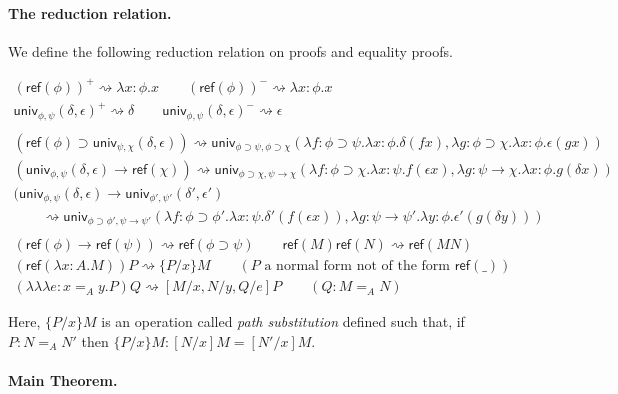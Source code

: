 \documentclass{easychair}
\newcommand{\univ}[4]{\mathsf{univ}_{{#1},{#2}} \left( {#3} , {#4} \right)}
\newcommand{\triplelambda}{\lambda \!\! \lambda \!\! \lambda}
\newcommand{\reff}[1]{\mathsf{ref} \left( {#1} \right)}
\begin{document}
\paragraph{The reduction relation.}

We define the following reduction relation on proofs and equality proofs.

\begin{gather*}
(\reff{\phi})^+ \rightsquigarrow \lambda x : \phi . x
\qquad
(\reff{\phi})^- \rightsquigarrow \lambda x : \phi . x
\\
\univ{\phi}{\psi}{\delta}{\epsilon}^+ \rightsquigarrow \delta
\qquad
\univ{\phi}{\psi}{\delta}{\epsilon}^- \rightsquigarrow \epsilon
\\ \\
(\reff \phi \supset \univ{\psi}{\chi}{\delta}{\epsilon}) \rightsquigarrow \univ{\phi \supset \psi}{\phi \supset \chi}{\lambda f : \phi \supset \psi . \lambda x : \phi . \delta (f x)}{\lambda g : \phi \supset \chi . \lambda x : \phi . \epsilon (g x)}
\\
(\univ{\phi}{\psi}{\delta}{\epsilon} \rightarrow \reff{\chi}) \rightsquigarrow \univ{\phi \supset \chi}{\psi \rightarrow \chi}{\lambda f : \phi \supset \chi. \lambda x : \psi . f (\epsilon x)}{\lambda g : \psi \rightarrow \chi . \lambda x : \phi . g (\delta x)}
\\
(\univ{\phi}{\psi}{\delta}{\epsilon} \rightarrow \univ{\phi'}{\psi'}{\delta'}{\epsilon'} \hspace{8cm} \\
\qquad \rightsquigarrow \univ{\phi \supset \phi'}{\psi \rightarrow \psi'}
{\lambda f : \phi \supset \phi' . \lambda x : \psi . \delta' (f (\epsilon x))}{\lambda g : \psi \rightarrow \psi' . \lambda y : \phi . \epsilon' (g (\delta y))}
\\ \\
(\reff{\phi} \rightarrow \reff{\psi}) \rightsquigarrow \reff{\phi \supset \psi}
\qquad
\reff{M} \reff{N} \rightsquigarrow \reff{MN}
\\
(\reff{\lambda x:A.M})P \rightsquigarrow \{ P / x \} M \qquad (P \text{ a normal form not of the form } \reff{\_})
\\
(\triplelambda e : x =_A y.P)Q \rightsquigarrow [M/x, N/y, Q/e]P \qquad (Q : M =_A N)
\end{gather*}

Here, $\{ P / x \}M$ is an operation called \emph{path substitution} defined such that, if $P : N =_A N'$ then $\{ P / x \} M : [N/x]M = [N'/x]M$.

\paragraph{Main Theorem.}
\end{document}
